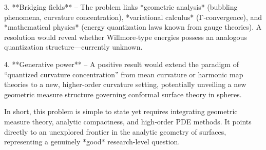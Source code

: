 3. **Bridging fields** – The problem links *geometric analysis* (bubbling phenomena, curvature concentration), *variational calculus* (Γ‑convergence), and *mathematical physics* (energy quantization laws known from gauge theories).  
   A resolution would reveal whether Willmore‑type energies possess an analogous quantization structure—currently unknown.

4. **Generative power** – A positive result would extend the paradigm of “quantized curvature concentration” from mean curvature or harmonic map theories to a new, higher‑order curvature setting, potentially unveiling a new geometric measure structure governing conformal surface theory in spheres.

In short, this problem is simple to state yet requires integrating geometric measure theory, analytic compactness, and high‑order PDE methods. It points directly to an unexplored frontier in the analytic geometry of surfaces, representing a genuinely *good* research-level question.